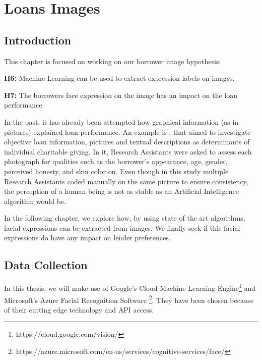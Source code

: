 
\chapter{Loans Images} %

\label{Chapter5} 


\section{Introduction}
This chapter is focused on working on our borrower image hypothesis:
\begin{tcolorbox}
\textbf{H6:} Machine Learning can be used to extract expression labels on images.
\end{tcolorbox}

\begin{tcolorbox}
\textbf{H7:} The borrowers face expression on the image has an impact on the loan performance.
\end{tcolorbox}

In the past, it has already been attempted how graphical information (as in pictures) explained loan performance. An example is \parencite{Jenq2011}, that aimed to investigate objective loan information, pictures and textual descriptions as determinants of individual charitable giving. In it, Research Assistants were asked to assess each photograph for qualities such as the borrower's appearance, age, gender, perceived honesty, and skin color on. Even though in this study multiple Research Assistants coded manually on the same picture to ensure consistency, the perception of a human being is not as stable as an Artificial Intelligence algorithm would be. \par
In the following chapter, we explore how, by using state of the art algorithms, facial expressions can be extracted from images. We finally seek if this facial expressions do have any impact on lender preferences.

\section{Data Collection}
In this thesis, we will make use of Google's Cloud Machine Learning Engine\footnote{https://cloud.google.com/vision/} and Microsoft's Azure Facial Recognition Software \footnote{https://azure.microsoft.com/en-us/services/cognitive-services/face/}. They have been chosen because of their cutting edge technology and API access.



